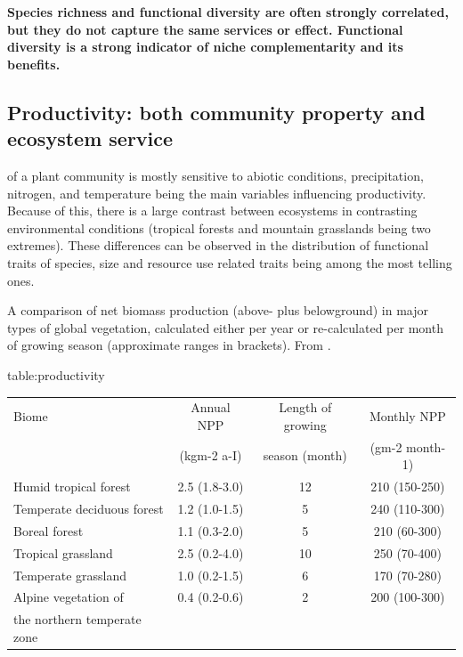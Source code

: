 


\textbf{Species richness and functional diversity are often strongly correlated, but they do not capture the same services or effect. Functional diversity is a strong indicator of niche complementarity and its benefits.}

\subsection{Productivity: both community property and ecosystem service}

 of a plant community is mostly sensitive to abiotic conditions, precipitation, nitrogen, and temperature being the main variables influencing productivity. Because of this, there is a large contrast between ecosystems in contrasting environmental conditions (tropical forests and mountain grasslands being two extremes). These differences can be observed in the distribution of functional traits of species, size and resource use related traits being among the most telling ones. 
\begin{table2*}
\caption{A comparison of net biomass production (above- plus belowground) in major types of global vegetation, calculated either per year or re-calculated per month of growing season (approximate ranges in brackets). From \citet{korner_alpine_2003}.}\caption{table:productivity}
\begin{tabular}{lccc}
\hline
Biome                                            & Annual NPP & Length of growing& Monthly NPP \\
                                                 & (kgm-2 a-I)                   & season (month)                  & (gm-2 month-1)                 \\ \hline
Humid tropical forest                            & 2.5 (1.8-3.0)                 & 12                       & 210 (150-250)                  \\
Temperate deciduous forest                       & 1.2 (1.0-1.5)                 & 5                        & 240 (110-300)                  \\
Boreal forest                                    & 1.1 (0.3-2.0)                 & 5                        & 210 (60-300)                   \\
Tropical grassland                               & 2.5 (0.2-4.0)                 & 10                       & 250 (70-400)                   \\
Temperate grassland                              & 1.0 (0.2-1.5)                 & 6                        & 170 (70-280)                   \\
Alpine vegetation of  & 0.4 (0.2-0.6)                 & 2                        & 200 (100-300)                  \\
the northern temperate zone & & & \\
\hline
\end{tabular}
\end{table2*}

